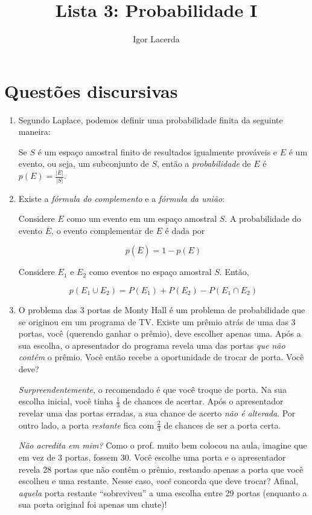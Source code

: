\documentclass{article}
\title{Lista 3: Probabilidade I}
\author{Igor Lacerda}
\begin{document}
\maketitle
\section*{Questões discursivas}
\begin{enumerate}
    \subsection*{Seção 6.1} 
    \item Segundo Laplace, podemos definir uma probabilidade finita da seguinte maneira:

        Se \( S \) é um espaço amostral finito de resultados igualmente prováveis e \( E \) é um evento, ou seja, um subconjunto de \( S\), então a \textit{probabilidade} de \( E \) é \( p(E) = \frac{|E|}{|S|} \).

    \item Existe a \textit{fórmula do complemento} e a \textit{fórmula da união}:

        Considere \( E \) como um evento em um espaço amostral \( S \). A probabilidade do evento \( \overline{E} \), o evento complementar de \( E \) é dada por

        \[  p(\overline{E}) = 1 - p(E)\]

        Considere \( E_1 \) e \( E_2 \) como eventos no espaço amostral \( S \). Então,

        \[ p(E_1 \cup E_2 ) = P(E_1) + P(E_2) - P(E_1 \cap E_2) \] 

    \item O problema das 3 portas de Monty Hall é um problema de probabilidade que se originou em um programa de TV. Existe um prêmio atrás de uma das 3 portas, você (querendo ganhar o prêmio), deve escolher apenas uma. Após a sua escolha, o apresentador do programa revela uma das portas \textit{que não contém} o prêmio. Você então recebe a oportunidade de trocar de porta. Você deve?

        \textit{Surpreendentemente,} o recomendado é que você troque de porta. Na sua escolha inicial, você tinha \( \frac{1}{3} \) de chances de acertar. Após o apresentador revelar uma das portas erradas, a sua chance de acerto \textit{não é alterada}. Por outro lado, a porta \textit{restante} fica com \( \frac{2}{3} \) de chances de ser a porta certa. 

        \textit{Não acredita em mim?} Como o prof. muito bem colocou na aula, imagine que em vez de 3 portas, fossem 30. Você escolhe uma porta e o apresentador revela 28 portas que não contêm o prêmio, restando apenas a porta que você escolheu e uma restante. Nesse caso, \textit{você} concorda que deve trocar? Afinal, \textit{aquela} porta restante ``sobreviveu'' a uma escolha entre 29 portas (enquanto a sua porta original foi apenas um chute)!


\end{enumerate}
\end{document}
